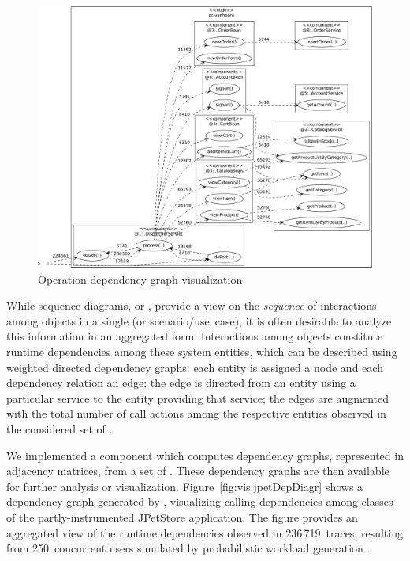\begin{figure}\centering
\includegraphics[width=\columnwidth]{figures/20090710-163529-jpetstore-250Threads-400sDuration-200sRampup-sequenceDiagram--20100428-operationDependencyGraph}%
\caption{Operation dependency graph visualization%
}
\label{fig:vis:jpetOperationDepDiagr}
\end{figure}

While sequence diagrams, or \executionTraces{}, provide a view on the \textit{sequence} of %
interactions among objects in a single \trace{} (or scenario/use~case), it is often %
desirable to analyze this information in an aggregated %
form. %
Interactions among objects constitute runtime dependencies among these system %
entities, which can be described using weighted directed dependency graphs: %
each entity is assigned a node and each dependency relation %
an edge; the edge is directed from an entity using %
a particular service to the entity providing that service; 
the edges are augmented with the total number of call actions %
among the respective entities observed in the considered set of \traces{}. %

We implemented a \KiekerTpan{} component which computes dependency graphs, %
represented in adjacency matrices, from a set of \messageTraces{}. %
These dependency graphs are then available for further analysis or visualization. %
Figure~\ref{fig:vis:jpetDepDiagr} shows a dependency graph generated by %
\KiekerTpan{}, visualizing calling dependencies among classes of the partly-instrumented %
JPetStore application. The figure provides an aggregated view of the runtime dependencies %
observed in 236\,719~traces, resulting from 250~concurrent users simulated by probabilistic %
workload generation~\citep{vanHoornRohrHasselbring2008GeneratingProbabilisticAndIntensityVaryingWorkloadForWebBasedSoftwareSystems}. %

